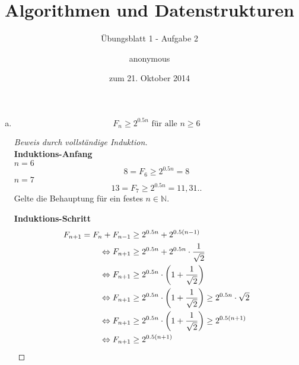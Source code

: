 \documentclass[a4paper]{scrartcl}
\title{Algorithmen und Datenstrukturen}
\subtitle{Übungsblatt 1 - Aufgabe 2}
\author{
    anonymous
}
\date{zum 21. Oktober 2014}
\begin{document}
\maketitle

\begin{enumerate}[(a)]
    \item
        \begin{behaupt}
            \begin{equation}
                F_n \geq 2^{\num{0,5}n} \text{ für alle } n \geq 6
            \end{equation}
        \end{behaupt}
        \begin{proof}[Beweis durch vollständige Induktion] \hfill \\
            \textbf{Induktions-Anfang} \\
            $n = 6$ \\
            \begin{equation}
                8 = F_6 \geq 2^{\num{0.5}n} = 8
            \end{equation}
            $n = 7$ \\
            \begin{equation}
                13 = F_7 \geq 2^{\num{0.5}n} = 11,31..
            \end{equation}
            Gelte die Behauptung für ein festes $n \in \mathbb{N}$.

            \textbf{Induktions-Schritt} \\
            \begin{equation}
                \begin{split}
                    F_{n+1} = F_{n} + F_{n-1} &\geq 2^{\num{0,5}n} + 2^{\num{0,5}(n-1)} \\
                    \Leftrightarrow F_{n+1} &\geq 2^{\num{0,5}n} + 2^{\num{0,5}n} \cdot \frac{1}{\sqrt{2}} \\
                    \Leftrightarrow F_{n+1} &\geq 2^{\num{0,5}n} \cdot \left( 1 + \frac{1}{\sqrt{2}} \right) \\
                    \Leftrightarrow F_{n+1} &\geq 2^{\num{0,5}n} \cdot \left( 1 + \frac{1}{\sqrt{2}} \right)  \geq 2^{\num{0,5}n} \cdot \sqrt{2} \\
                    \Leftrightarrow F_{n+1} &\geq 2^{\num{0,5}n} \cdot \left( 1 + \frac{1}{\sqrt{2}} \right)  \geq 2^{\num{0,5}(n+1)} \\
                    \Leftrightarrow F_{n+1} &\geq  2^{\num{0,5}(n+1)}
                \end{split}
            \end{equation}
        \end{proof}


\end{enumerate}
\end{document}
